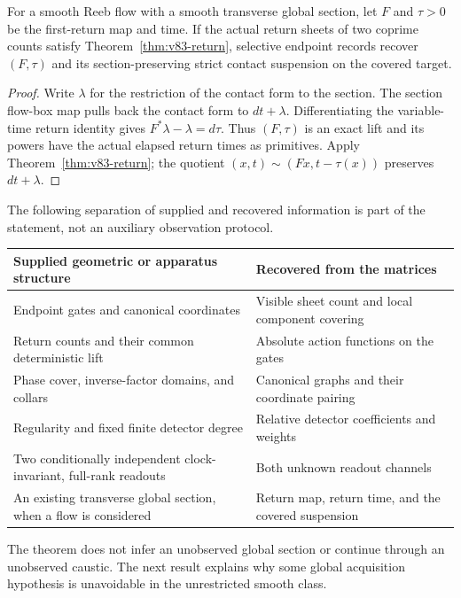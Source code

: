 \begin{corollary}
\label{cor:v83-contact}
For a smooth Reeb flow with a smooth transverse global section, let
$F$ and $\tau>0$ be the first-return map and time. If the actual
return sheets of two coprime counts satisfy Theorem~\ref{thm:v83-return},
selective endpoint records recover $(F,\tau)$ and its section-preserving
strict contact suspension on the covered target.
\end{corollary}
\begin{proof}
Write $\lambda$ for the restriction of the contact form to the section.
The section flow-box map pulls back the contact form to $dt+\lambda$.
Differentiating the variable-time return identity gives
$F^*\lambda-\lambda=d\tau$. Thus $(F,\tau)$ is an exact lift and
its powers have the actual elapsed return times as primitives. Apply
Theorem~\ref{thm:v83-return}; the quotient
$(x,t)\sim(Fx,t-\tau(x))$ preserves $dt+\lambda$.
\end{proof}

The following separation of supplied and recovered information is part
of the statement, not an auxiliary observation protocol.
\begin{center}
\small
\begin{tabular}{@{}p{}p{}@{}}
\toprule
Supplied geometric or apparatus structure & Recovered from the matrices \\
\midrule
Endpoint gates and canonical coordinates & Visible sheet count and local component covering \\
Return counts and their common deterministic lift & Absolute action functions on the gates \\
Phase cover, inverse-factor domains, and collars & Canonical graphs and their coordinate pairing \\
Regularity and fixed finite detector degree & Relative detector coefficients and weights \\
Two conditionally independent clock-invariant, full-rank readouts & Both unknown readout channels \\
An existing transverse global section, when a flow is considered & Return map, return time, and the covered suspension \\
\bottomrule
\end{tabular}
\end{center}
The theorem does not infer an unobserved global section or continue
through an unobserved caustic. The next result explains why some global
acquisition hypothesis is unavoidable in the unrestricted smooth class.

